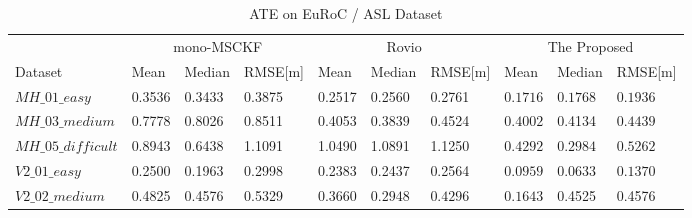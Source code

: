 \documentclass[a4paper, 10pt, conference]{ieeeconf}      %
\begin{document}
\begin{table} %
	\caption{ATE on EuRoC / ASL Dataset}
	\centering %
	\begin{tabular}{p{2.2cm} | p{1.2cm} p{1.2cm} p{1.5cm} | p{1.2cm} p{1.2cm} p{1.5cm} | p{1.2cm} p{1.2cm} p{1.2cm}} %
		\toprule %
		& \multicolumn{3}{c}{mono-MSCKF} 	& \multicolumn{3}{c}{Rovio}  & \multicolumn{3}{c}{The Proposed}  \\ %
		\cmidrule(l){2-10} %
		Dataset & Mean & Median & RMSE[m] & Mean & Median & RMSE[m] & Mean & Median & RMSE[m]  \\ %
		\midrule %
		$MH\_01\_easy$ & 0.3536 & 0.3433 & 0.3875 & 0.2517 & 0.2560 & 0.2761 &  $\bm{0.1716}$ & $\bm{0.1768}$ & $\bm{0.1936}$ \\ %
		
		$MH\_03\_medium$ & 0.7778 & 0.8026 & 0.8511 & 0.4053 & $\bm{0.3839}$ & 0.4524 & $\bm{0.4002}$ & 0.4134 & $\bm{0.4439}$ \\ %
		
		$MH\_05\_difficult$ & 0.8943 & 0.6438 & 1.1091 & 1.0490 & 1.0891 & 1.1250 & $\bm{0.4292}$ & $\bm{0.2984}$ & $\bm{0.5262}$ \\ %
		
		$V2\_01\_easy$ & 0.2500 & 0.1963 & 0.2998 & 0.2383 & 0.2437 & 0.2564 & $\bm{0.0959}$ & $\bm{0.0633}$ & $\bm{0.1370}$ \\ %
		
		$V2\_02\_medium $ & 0.4825 & 0.4576 & 0.5329 & 0.3660 & $\bm{0.2948}$ & $\bm{0.4296}$ & $\bm{0.1643}$ & 0.4525 & 0.4576 \\ %
	
		\bottomrule %
	\end{tabular}
	
\end{table}
\end{document}
